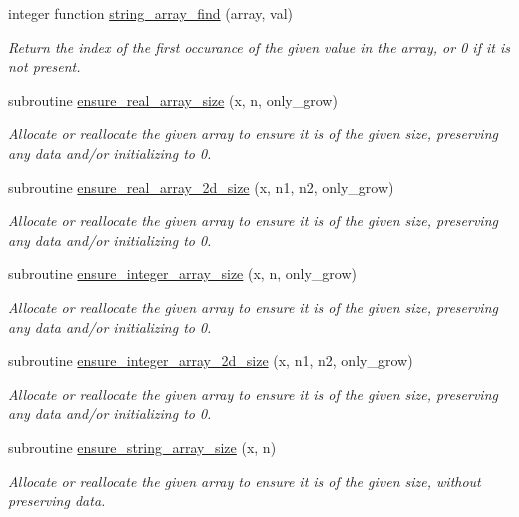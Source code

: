 \begin{DoxyCompactItemize}
integer function \mbox{\hyperlink{namespacepmc__util_a20346c4da2a25e5b8a3215240e851e5f}{string\+\_\+array\+\_\+find}} (array, val)
\begin{DoxyCompactList}\small\item\em Return the index of the first occurance of the given value in the array, or 0 if it is not present. \end{DoxyCompactList}\item 
subroutine \mbox{\hyperlink{namespacepmc__util_ad5e823b848ba95bfd29d67f1cfee7a7a}{ensure\+\_\+real\+\_\+array\+\_\+size}} (x, n, only\+\_\+grow)
\begin{DoxyCompactList}\small\item\em Allocate or reallocate the given array to ensure it is of the given size, preserving any data and/or initializing to 0. \end{DoxyCompactList}\item 
subroutine \mbox{\hyperlink{namespacepmc__util_a26a0550006c522169b83c4f9c9df69d1}{ensure\+\_\+real\+\_\+array\+\_\+2d\+\_\+size}} (x, n1, n2, only\+\_\+grow)
\begin{DoxyCompactList}\small\item\em Allocate or reallocate the given array to ensure it is of the given size, preserving any data and/or initializing to 0. \end{DoxyCompactList}\item 
subroutine \mbox{\hyperlink{namespacepmc__util_adbf9a41092ec1df9139a6f149b644102}{ensure\+\_\+integer\+\_\+array\+\_\+size}} (x, n, only\+\_\+grow)
\begin{DoxyCompactList}\small\item\em Allocate or reallocate the given array to ensure it is of the given size, preserving any data and/or initializing to 0. \end{DoxyCompactList}\item 
subroutine \mbox{\hyperlink{namespacepmc__util_a0cf0527cde4f90e88c216b51686de71d}{ensure\+\_\+integer\+\_\+array\+\_\+2d\+\_\+size}} (x, n1, n2, only\+\_\+grow)
\begin{DoxyCompactList}\small\item\em Allocate or reallocate the given array to ensure it is of the given size, preserving any data and/or initializing to 0. \end{DoxyCompactList}\item 
subroutine \mbox{\hyperlink{namespacepmc__util_a61a37625f7eff4bd4bbba002652b596d}{ensure\+\_\+string\+\_\+array\+\_\+size}} (x, n)
\begin{DoxyCompactList}\small\item\em Allocate or reallocate the given array to ensure it is of the given size, without preserving data. \end{DoxyCompactList}\item 

\end{DoxyCompactItemize}

